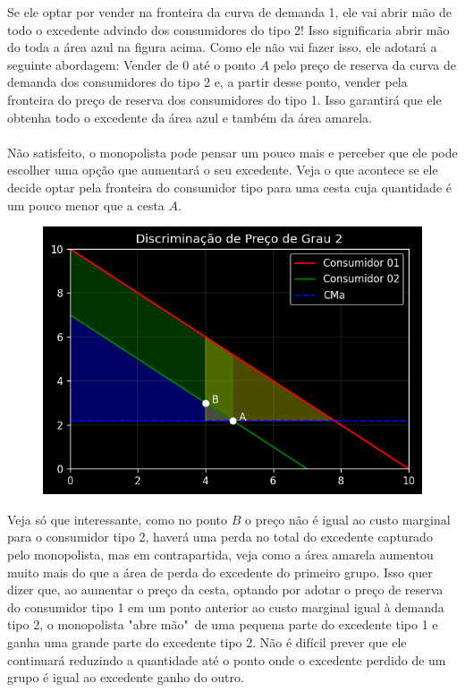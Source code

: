 \documentclass[a4paper,11pt,oneside]{book}
\theoremstyle{definition}
\theoremstyle{break}
\begin{document}
Se ele optar por vender na fronteira da curva de demanda 1, ele vai abrir mão de todo o excedente advindo dos consumidores do tipo 2! Isso significaria abrir mão do toda a área azul na figura acima. Como ele não vai fazer isso, ele adotará a seguinte abordagem: Vender de $0$ até o ponto $A$ pelo preço de reserva da curva de demanda dos consumidores do tipo 2 e, a partir desse ponto, vender pela fronteira do preço de reserva dos consumidores do tipo 1. Isso garantirá que ele obtenha todo o excedente da área azul e também da área amarela.
\\
\\
Não satisfeito, o monopolista pode pensar um pouco mais e perceber que ele pode escolher uma opção que aumentará o seu excedente. Veja o que acontece se ele decide optar pela fronteira do consumidor tipo para uma cesta cuja quantidade é um pouco menor que a cesta $A$.

\begin{figure}[H]
\centering
\includegraphics[scale=0.8]{cap26_3-discriminacao_grau2_2.png}
\end{figure}

Veja só que interessante, como no ponto $B$ o preço não é igual ao custo marginal para o consumidor tipo 2, haverá uma perda no total do excedente capturado pelo monopolista, mas em contrapartida, veja como a área amarela aumentou muito mais do que a área de perda do excedente do primeiro grupo. Isso quer dizer que, ao aumentar o preço da cesta, optando por adotar o preço de reserva do consumidor tipo 1 em um ponto anterior ao custo marginal igual à demanda tipo 2, o monopolista "abre mão"\ de uma pequena parte do excedente tipo 1 e ganha uma grande parte do excedente tipo 2. Não é difícil prever que ele continuará reduzindo a quantidade até o ponto onde o excedente perdido de um grupo é igual ao excedente ganho do outro.
\end{document}
